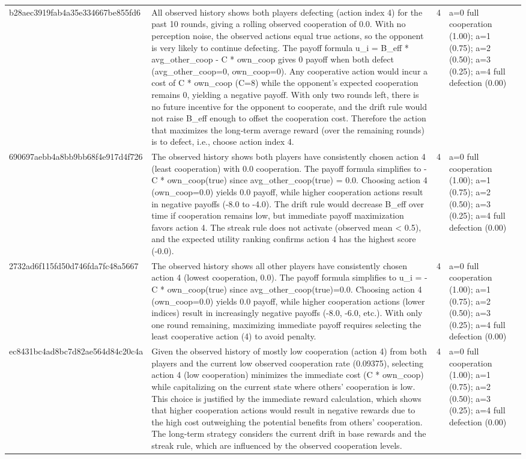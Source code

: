 \begin{tabular}{lp{8cm}ll l}
b28aec3919fab4a35e334667be855fd6 & All observed history shows both players defecting (action index 4) for the past 10 rounds, giving a rolling observed cooperation of 0.0. With no perception noise, the observed actions equal true actions, so the opponent is very likely to continue defecting. The payoff formula u\_i = B\_eff * avg\_other\_coop - C * own\_coop gives 0 payoff when both defect (avg\_other\_coop=0, own\_coop=0). Any cooperative action would incur a cost of C * own\_coop (C=8) while the opponent’s expected cooperation remains 0, yielding a negative payoff. With only two rounds left, there is no future incentive for the opponent to cooperate, and the drift rule would not raise B\_eff enough to offset the cooperation cost. Therefore the action that maximizes the long‑term average reward (over the remaining rounds) is to defect, i.e., choose action index 4. & 4 & a=0 full cooperation (1.00); a=1 (0.75); a=2 (0.50); a=3 (0.25); a=4 full defection (0.00) &  \\
690697aebb4a8bb9bb68f4e917d4f726 & The observed history shows both players have consistently chosen action 4 (least cooperation) with 0.0 cooperation. The payoff formula simplifies to -C * own\_coop(true) since avg\_other\_coop(true) = 0.0. Choosing action 4 (own\_coop=0.0) yields 0.0 payoff, while higher cooperation actions result in negative payoffs (-8.0 to -4.0). The drift rule would decrease B\_eff over time if cooperation remains low, but immediate payoff maximization favors action 4. The streak rule does not activate (observed mean < 0.5), and the expected utility ranking confirms action 4 has the highest score (-0.0). & 4 & a=0 full cooperation (1.00); a=1 (0.75); a=2 (0.50); a=3 (0.25); a=4 full defection (0.00) &  \\
2732ad6f115fd50d746fda7fc48a5667 & The observed history shows all other players have consistently chosen action 4 (lowest cooperation, 0.0). The payoff formula simplifies to u\_i = -C * own\_coop(true) since avg\_other\_coop(true)=0.0. Choosing action 4 (own\_coop=0.0) yields 0.0 payoff, while higher cooperation actions (lower indices) result in increasingly negative payoffs (-8.0, -6.0, etc.). With only one round remaining, maximizing immediate payoff requires selecting the least cooperative action (4) to avoid penalty. & 4 & a=0 full cooperation (1.00); a=1 (0.75); a=2 (0.50); a=3 (0.25); a=4 full defection (0.00) &  \\
ec8431bc4ad8bc7d82ae564d84c20c4a & Given the observed history of mostly low cooperation (action 4) from both players and the current low observed cooperation rate (0.09375), selecting action 4 (low cooperation) minimizes the immediate cost (C * own\_coop) while capitalizing on the current state where others' cooperation is low. This choice is justified by the immediate reward calculation, which shows that higher cooperation actions would result in negative rewards due to the high cost outweighing the potential benefits from others' cooperation. The long-term strategy considers the current drift in base rewards and the streak rule, which are influenced by the observed cooperation levels. & 4 & a=0 full cooperation (1.00); a=1 (0.75); a=2 (0.50); a=3 (0.25); a=4 full defection (0.00) &  \\

\end{tabular}
